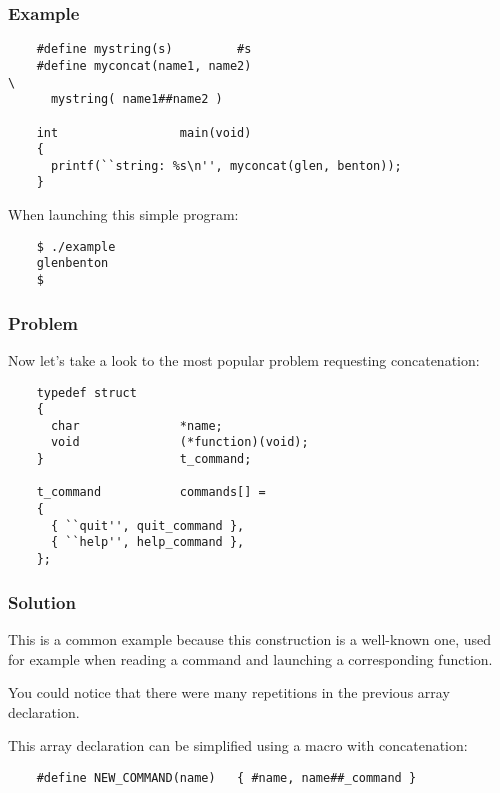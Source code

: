 {%

\begin{frame}[containsverbatim]
  \frametitle{Example}

  \begin{verbatim}
    #define mystring(s)         #s
    #define myconcat(name1, name2)                                      \
      mystring( name1##name2 )

    int                 main(void)
    {
      printf(``string: %s\n'', myconcat(glen, benton));
    }
  \end{verbatim}

  When launching this simple program:

  \begin{verbatim}
    $ ./example
    glenbenton
    $ 
  \end{verbatim}
\end{frame}


\begin{frame}[containsverbatim]
  \frametitle{Problem}

  Now let's take a look to the most popular problem requesting concatenation:

  \begin{verbatim}
    typedef struct
    {
      char              *name;
      void              (*function)(void);
    }                   t_command;

    t_command           commands[] =
    {
      { ``quit'', quit_command },
      { ``help'', help_command },
    };
  \end{verbatim}
\end{frame}


\begin{frame}[containsverbatim]
  \frametitle{Solution}

  This is a common example because this construction is a well-known one,
  used for example when reading a command and launching a corresponding
  function.

  \nl

  You could notice that there were many repetitions in the previous
  array declaration.

  \nl

  This array declaration can be simplified using a macro with concatenation:

  \begin{verbatim}
    #define NEW_COMMAND(name)   { #name, name##_command }


\end{verbatim}
\end{frame}}
